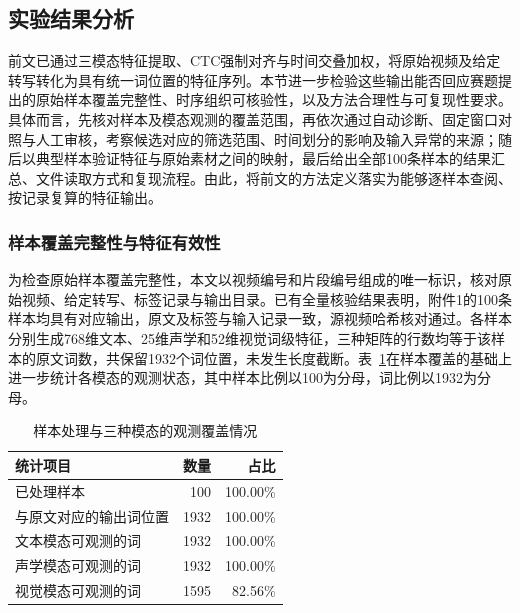 \subsection{实验结果分析}
\label{sec:p1_results}

前文已通过三模态特征提取、CTC强制对齐与时间交叠加权，将原始视频及给定转写转化为具有统一词位置的特征序列。本节进一步检验这些输出能否回应赛题提出的原始样本覆盖完整性、时序组织可核验性，以及方法合理性与可复现性要求。具体而言，先核对样本及模态观测的覆盖范围，再依次通过自动诊断、固定窗口对照与人工审核，考察候选对应的筛选范围、时间划分的影响及输入异常的来源；随后以典型样本验证特征与原始素材之间的映射，最后给出全部100条样本的结果汇总、文件读取方式和复现流程。由此，将前文的方法定义落实为能够逐样本查阅、按记录复算的特征输出。

\subsubsection{样本覆盖完整性与特征有效性}
\label{sec:p1_quality_scope}

为检查原始样本覆盖完整性，本文以视频编号和片段编号组成的唯一标识，核对原始视频、给定转写、标签记录与输出目录。已有全量核验结果表明，附件1的100条样本均具有对应输出，原文及标签与输入记录一致，源视频哈希核对通过。各样本分别生成768维文本、25维声学和52维视觉词级特征，三种矩阵的行数均等于该样本的原文词数，共保留1932个词位置，未发生长度截断。表~\ref{tab:p1_result_overview}在样本覆盖的基础上进一步统计各模态的观测状态，其中样本比例以100为分母，词比例以1932为分母。

\begin{table}[H]
    \centering\small
    \caption{样本处理与三种模态的观测覆盖情况}
    \label{tab:p1_result_overview}
    \setlength{\tabcolsep}{6pt}
    \renewcommand{\arraystretch}{1.12}
    \ifdefined\pOneCompactTableBox\else\newsavebox{\pOneCompactTableBox}\fi
    \begin{lrbox}{\pOneCompactTableBox}
    \begin{tabular}{lrr}
        \toprule
        统计项目 & 数量 & 占比\\
        \midrule
        已处理样本 & 100 & 100.00\%\\
        与原文对应的输出词位置 & 1932 & 100.00\%\\
        文本模态可观测的词 & 1932 & 100.00\%\\
        声学模态可观测的词 & 1932 & 100.00\%\\
        视觉模态可观测的词 & 1595 & 82.56\%\\
        \bottomrule
    \end{tabular}
    \end{lrbox}
    \usebox{\pOneCompactTableBox}
\par\smallskip
\end{table}

